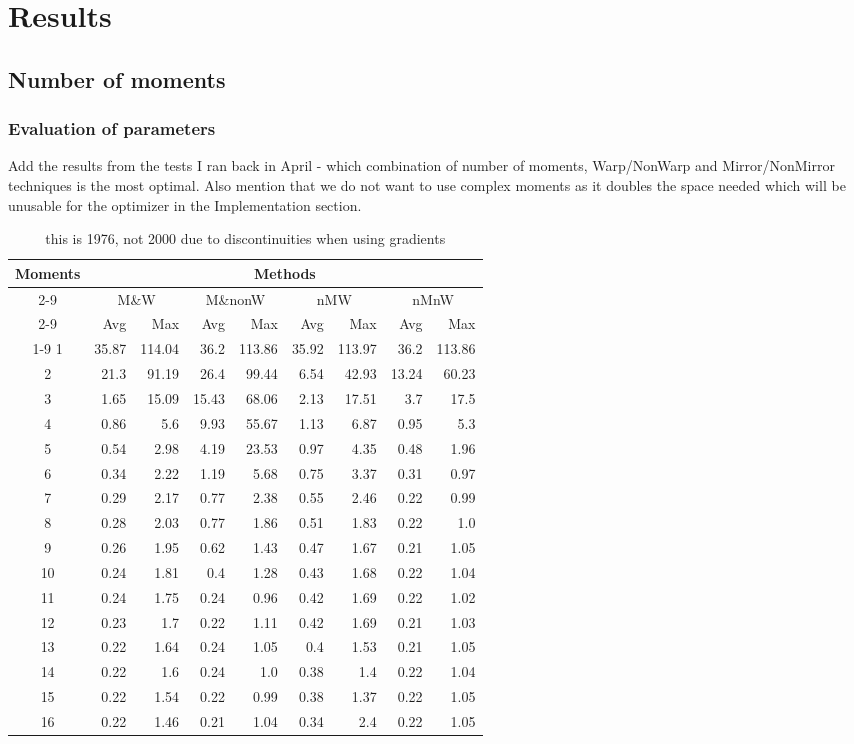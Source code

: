 \chapter{Results}

\section{Number of moments}

\subsection{Evaluation of parameters}

Add the results from the tests I ran back in April - which combination of number of moments, Warp/NonWarp and Mirror/NonMirror techniques is the most optimal. Also mention that we do not want to use complex moments as it doubles the space needed which will be unusable for the optimizer in the Implementation section. 

\begin{table}[t]
	\centering
	\begin{tabular}{crrrrrrrr}
		\toprule
		\multirow{4}{*}{Moments} &
		\multicolumn{8}{c}{Methods} \\
		\cmidrule(lr){2-9}
		&\multicolumn{2}{c}{M\&W} &
		\multicolumn{2}{c}{M\&nonW} &
		\multicolumn{2}{c}{nMW} &
		\multicolumn{2}{c}{nMnW}\\
		\cmidrule(lr){2-9}
		& Avg & Max & Avg & Max & Avg & Max & Avg & Max \\
		\cmidrule(lr){1-9}
		1&35.87&114.04&36.2&113.86&35.92&113.97&36.2&113.86\\
		2&21.3&91.19&26.4&99.44&6.54&42.93&13.24&60.23\\
		3&1.65&15.09&15.43&68.06&2.13&17.51&3.7&17.5\\
		4&0.86&5.6&9.93&55.67&1.13&6.87&0.95&5.3\\
		5&0.54&2.98&4.19&23.53&0.97&4.35&0.48&1.96\\
		6&0.34&2.22&1.19&5.68&0.75&3.37&0.31&0.97\\
		7&0.29&2.17&0.77&2.38&0.55&2.46&0.22&0.99\\
		8&0.28&2.03&0.77&1.86&0.51&1.83&0.22&1.0\\
		9&0.26&1.95&0.62&1.43&0.47&1.67&0.21&1.05\\
		10&0.24&1.81&0.4&1.28&0.43&1.68&0.22&1.04\\
		11&0.24&1.75&0.24&0.96&0.42&1.69&0.22&1.02\\
		12&0.23&1.7&0.22&1.11&0.42&1.69&0.21&1.03\\
		13&0.22&1.64&0.24&1.05&0.4&1.53&0.21&1.05\\
		14&0.22&1.6&0.24&1.0&0.38&1.4&0.22&1.04\\
		15&0.22&1.54&0.22&0.99&0.38&1.37&0.22&1.05\\
		16&0.22&1.46&0.21&1.04&0.34&2.4&0.22&1.05\\
		\bottomrule
	\end{tabular}
\caption{this is 1976, not 2000 due to discontinuities when using gradients}
\end{table}

